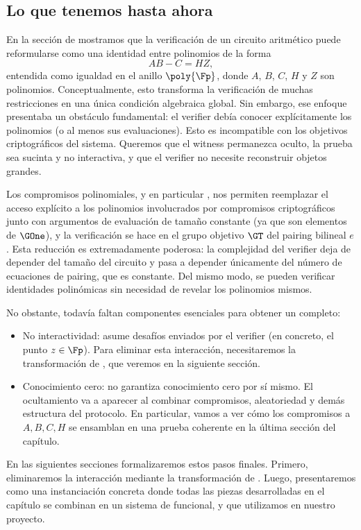 \subsection{Lo que tenemos hasta ahora}

En la sección de \QAP mostramos que la verificación de un circuito aritmético puede reformularse como una identidad entre polinomios de la forma
$$AB - C = HZ,$$
entendida como igualdad en el anillo $\poly{\Fp}$, donde $A$, $B$, $C$, $H$ y $Z$ son polinomios. Conceptualmente, esto transforma la verificación de muchas restricciones en una única condición algebraica global. Sin embargo, ese enfoque presentaba un obstáculo fundamental: el verifier debía conocer explícitamente los polinomios (o al menos sus evaluaciones). Esto es incompatible con los objetivos criptográficos del sistema. Queremos que el witness permanezca oculto, la prueba sea sucinta y no interactiva, y que el verifier no necesite reconstruir objetos grandes.


Los compromisos polinomiales, y en particular \KZG, nos permiten reemplazar el acceso explícito a los polinomios involucrados por compromisos criptográficos junto con argumentos de evaluación de tamaño constante (ya que son elementos de $\GOne$), y la verificación se hace en el grupo objetivo $\GT$ del pairing bilineal $e$. Esta reducción es extremadamente poderosa: la complejidad del verifier deja de depender del tamaño del circuito y pasa a depender únicamente del número de ecuaciones de pairing, que es constante. Del mismo modo, se pueden verificar identidades polinómicas sin necesidad de revelar los polinomios mismos.

No obstante, todavía faltan componentes esenciales para obtener un \zkSNARK completo:
\begin{itemize}[itemsep=0.1 cm]
	\item No interactividad: \KZG asume desafíos enviados por el verifier (en concreto, el punto $z \in \Fp$). Para eliminar esta interacción, necesitaremos la transformación de \FiatShamir, que veremos en la siguiente sección.
	\item Conocimiento cero: \KZG no garantiza conocimiento cero por sí mismo. El ocultamiento va a aparecer al combinar compromisos, aleatoriedad y demás estructura del protocolo. En particular, vamos a ver cómo los compromisos a $A, B, C, H$ se ensamblan en una prueba coherente en la última sección del capítulo.
\end{itemize}

En las siguientes secciones formalizaremos estos pasos finales. Primero, eliminaremos la interacción mediante la transformación de \FiatShamir \cite{Fiat}. Luego, presentaremos \Groth \cite{cryptoeprint:2016/260} como una instanciación concreta donde todas las piezas desarrolladas en el capítulo se combinan en un sistema de \zkSNARK funcional, y que utilizamos en nuestro proyecto.
